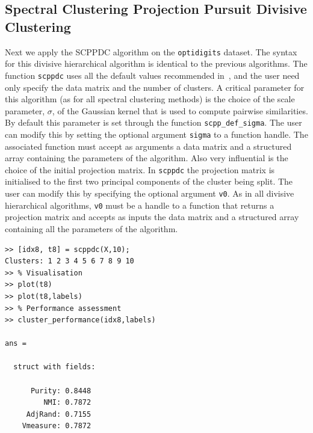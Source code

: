 \documentclass{book}
\begin{document}
\subsection{Spectral Clustering Projection Pursuit Divisive Clustering}

Next we apply the SCPPDC algorithm on the {\tt optidigits} dataset. The syntax
for this divisive hierarchical algorithm is identical to the previous
algorithms. The function {\tt scppdc} uses all the default values recommended
in~\cite{HofmeyrPE2018}, and the user need only specify the data matrix and the
number of clusters. 
%
A critical parameter for this algorithm (as for all
spectral clustering methods) is the choice of the scale parameter, $\sigma$, of
the Gaussian kernel that is used to compute pairwise similarities.
%
By default this parameter is set through the function {\tt scpp\_def\_sigma}.
The user can modify this by setting the optional argument {\tt sigma}
to a function handle. The associated function must accept as
arguments a data matrix and a structured array containing the parameters
of the algorithm.
%
Also very influential is the choice of the initial projection matrix.
In {\tt scppdc} the projection matrix is initialised to the first two principal
components of the cluster being split. 
The user can modify this by specifying the optional
argument {\tt v0}. As in all divisive hierarchical algorithms, {\tt v0} must
be a handle to a
function that returns a projection matrix and accepts as inputs
the data matrix and a structured array containing all the parameters
of the algorithm.

\begin{verbatim}
>> [idx8, t8] = scppdc(X,10);
Clusters: 1 2 3 4 5 6 7 8 9 10
>> % Visualisation
>> plot(t8)
>> plot(t8,labels)
>> % Performance assessment
>> cluster_performance(idx8,labels)

ans = 

  struct with fields:

      Purity: 0.8448
         NMI: 0.7872
     AdjRand: 0.7155
    Vmeasure: 0.7872

\end{verbatim}
\end{document}
